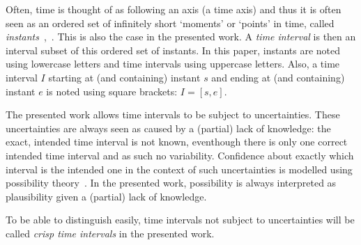 Often, time is thought of as following an axis (a time axis) and thus it is often seen as an ordered set of infinitely short `moments' or `points' in time, called \emph{instants}~\cite{Dyreson1994},~\cite{Jensen1998}. This is also the case in the presented work. A \emph{time interval} is then an interval subset of this ordered set of instants. In this paper, instants are noted using lowercase letters and time intervals using uppercase letters. Also, a time interval $I$ starting at (and containing) instant $s$ and ending at (and containing) instant $e$ is noted using square brackets: $I = \left[s, e\right]$.

The presented work allows time intervals to be subject to uncertainties. These uncertainties are always seen as caused by a (partial) lack of knowledge: the exact, intended time interval is not known, eventhough there is only one correct intended time interval and as such no variability. Confidence about exactly which interval is the intended one in the context of such uncertainties is modelled using possibility theory~\cite{DidierDubois1988a}. In the presented work, possibility is always interpreted as plausibility given a (partial) lack of knowledge.

To be able to distinguish easily, time intervals not subject to uncertainties will be called \emph{crisp time intervals} in the presented work.